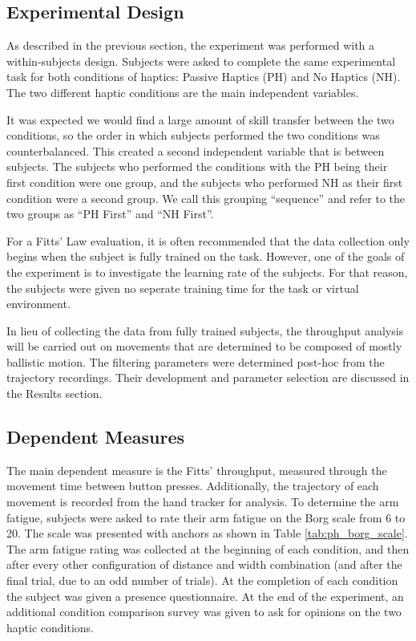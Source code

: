 \subsection{Experimental Design}

As described in the previous section, the experiment was performed with a within-subjects design.
Subjects were asked to complete the same experimental task for both conditions of haptics: Passive Haptics (PH) and No Haptics (NH).
The two different haptic conditions are the main independent variables.

It was expected we would find a large amount of skill transfer between the two conditions, so the order in which subjects performed the two conditions was counterbalanced.
This created a second independent variable that is between subjects.
The subjects who performed the conditions with the PH being their first condition were one group, and the subjects who performed NH as their first condition were a second group.
We call this grouping ``sequence'' and refer to the two groups as ``PH First'' and ``NH First''.

For a Fitts' Law evaluation, it is often recommended that the data collection only begins when the subject is fully trained on the task.
However, one of the goals of the experiment is to investigate the learning rate of the subjects.
For that reason, the subjects were given no seperate training time for the task or virtual environment.

In lieu of collecting the data from fully trained subjects, the throughput analysis will be carried out on movements that are determined to be composed of mostly ballistic motion.
The filtering parameters were determined post-hoc from the trajectory recordings.
Their development and parameter selection are discussed in the Results section.

\subsection{Dependent Measures}

The main dependent measure is the Fitts' throughput, measured through the movement time between button presses.
Additionally, the trajectory of each movement is recorded from the hand tracker for analysis.
To determine the arm fatigue, subjects were asked to rate their arm fatigue on the Borg scale from 6 to 20.
The scale was presented with anchors as shown in Table \ref{tab:ph_borg_scale}.
The arm fatigue rating was collected at the beginning of each condition, and then after every other configuration of distance and width combination (and after the final trial, due to an odd number of trials).
At the completion of each condition the subject was given a presence questionnaire.
At the end of the experiment, an additional condition comparison survey was given to ask for opinions on the two haptic conditions.

